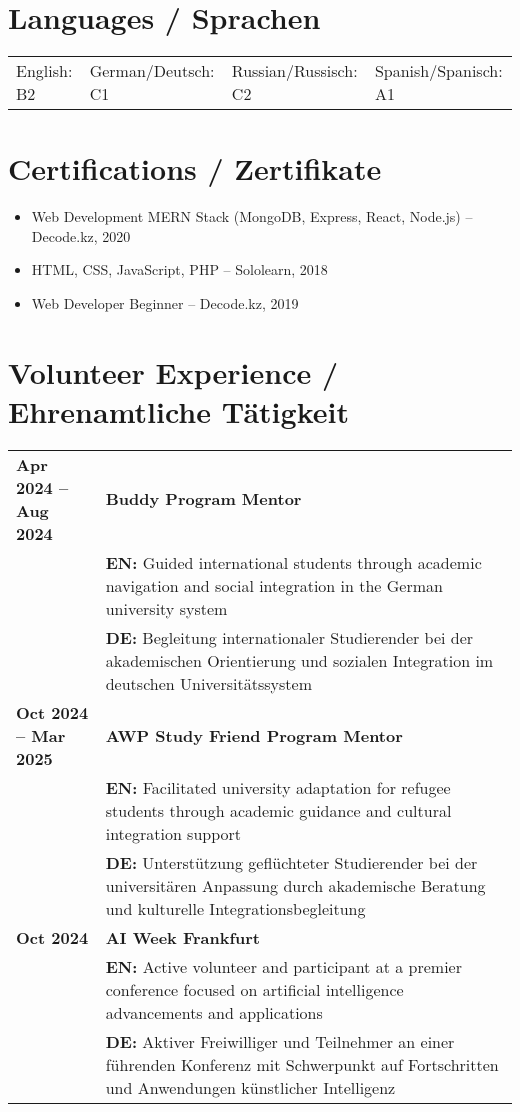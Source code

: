 \documentclass[11pt,a4paper]{article}
\begin{document}
\section*{Languages / Sprachen}
\begin{tabular}{@{}l@{\hspace{2em}}l@{\hspace{2em}}l@{\hspace{2em}}l@{}}
English: B2 & German/Deutsch: C1 & Russian/Russisch: C2 & Spanish/Spanisch: A1
\end{tabular}

\section*{Certifications / Zertifikate}
\begin{itemize}[leftmargin=*, itemsep=0.6em]
    \item Web Development MERN Stack (MongoDB, Express, React, Node.js) – Decode.kz, 2020
    \item HTML, CSS, JavaScript, PHP – Sololearn, 2018
    \item Web Developer Beginner – Decode.kz, 2019
\end{itemize}

\section*{Volunteer Experience / Ehrenamtliche Tätigkeit}
\begin{tabularx}{\textwidth}{@{}l X@{}}
\textbf{Apr 2024 -- Aug 2024} & \textbf{Buddy Program Mentor}\\
& \textbf{EN:} Guided international students through academic navigation and social integration in the German university system\\
& \textbf{DE:} Begleitung internationaler Studierender bei der akademischen Orientierung und sozialen Integration im deutschen Universitätssystem\\[0.8em]
\textbf{Oct 2024 -- Mar 2025} & \textbf{AWP Study Friend Program Mentor}\\
& \textbf{EN:} Facilitated university adaptation for refugee students through academic guidance and cultural integration support\\
& \textbf{DE:} Unterstützung geflüchteter Studierender bei der universitären Anpassung durch akademische Beratung und kulturelle Integrationsbegleitung\\[0.8em]
\textbf{Oct 2024} & \textbf{AI Week Frankfurt}\\
& \textbf{EN:} Active volunteer and participant at a premier conference focused on artificial intelligence advancements and applications\\
& \textbf{DE:} Aktiver Freiwilliger und Teilnehmer an einer führenden Konferenz mit Schwerpunkt auf Fortschritten und Anwendungen künstlicher Intelligenz
\end{tabularx}
\end{document}
